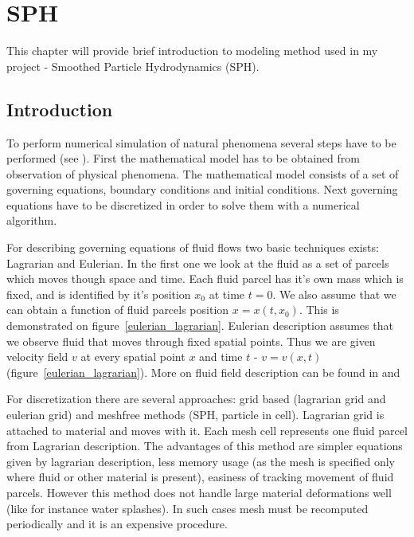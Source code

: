 

\chapter{SPH}
\label{chap:sph}


\graphicspath{{sph/figures/}}

This chapter will provide brief introduction to modeling method used in my project - Smoothed Particle Hydrodynamics (SPH).


\section{Introduction}
To perform numerical simulation of natural phenomena several steps have to be performed (see \cite[section 1.1.2]{Liu}). First the mathematical model has to be obtained from observation of physical phenomena. The mathematical model consists of a set of governing equations, boundary conditions and initial conditions. Next governing equations have to be discretized in order to solve them with a numerical algorithm.

For describing governing equations of fluid flows two basic techniques exists: Lagrarian and Eulerian. In the first one we look at the fluid as a set of parcels which moves though space and time. Each fluid parcel has it's own mass which is fixed, and is identified by it's position $x_0$ at time $t = 0$. We also assume that we can obtain a function of fluid parcels position $x = x(t, x_0)$. This is demonstrated on figure~\ref{eulerian_lagrarian}.
Eulerian description assumes that we observe fluid that moves through fixed spatial points. Thus we are given velocity field $v$ at every spatial point $x$ and time $t$ - $v = v(x, t)$ (figure~\ref{eulerian_lagrarian}). 
More on fluid field description can be found in \cite[section 2.1]{Hauke2008} and \cite{Price06}


For discretization there are several approaches: grid based (lagrarian grid and eulerian grid) and meshfree methods (SPH, particle in cell).
Lagrarian grid is attached to material and moves with it. Each mesh cell represents one fluid parcel from Lagrarian description. The advantages of this method are simpler equations given by lagrarian description, less memory usage (as the mesh is specified only where fluid or other material is present), easiness of tracking movement of fluid parcels. However this method does not handle large material deformations well (like for instance water splashes). In such cases mesh must be recomputed periodically and it is an expensive procedure.

